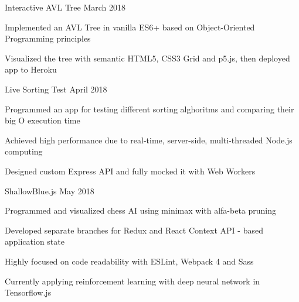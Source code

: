 
\begin{cventries}

\cventryproject
  {Interactive AVL Tree} %
  {March 2018} %
  {
    \begin{cvitems} %
      \item Implemented an AVL Tree in vanilla ES6+ based on Object-Oriented Programming principles
      \item Visualized the tree with semantic HTML5, CSS3 Grid and p5.js, then deployed app to Heroku
  \end{cvitems}
  }

\cventryproject
{Live Sorting Test} %
{April 2018} %
  {
    \begin{cvitems} %
      \item Programmed an app for testing different sorting alghoritms and comparing their big O execution time
      \item Achieved high performance due to real-time, server-side, multi-threaded Node.js computing
      \item Designed custom Express API and fully mocked it with Web Workers
  \end{cvitems}
  }

\cventryproject
{ShallowBlue.js} %
{May 2018} %
  {
    \begin{cvitems} %
      \item Programmed and visualized chess AI using minimax with alfa-beta pruning
      \item Developed separate branches for Redux and React Context API - based application state
      \item Highly focused on code readability with ESLint, Webpack 4 and Sass
      \item Currently applying reinforcement learning with deep neural network in Tensorflow.js
  \end{cvitems}
  }


\end{cventries}
